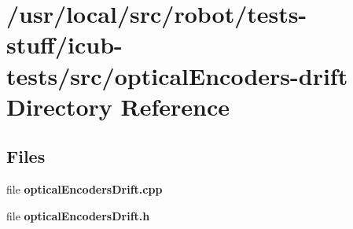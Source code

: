 \section{/usr/local/src/robot/tests-\/stuff/icub-\/tests/src/optical\-Encoders-\/drift Directory Reference}
\label{dir_6292a1d34f76cbbc5d1c993d8b5a10cd}
\subsection*{Files}
\begin{DoxyCompactItemize}
\item 
file {\bfseries optical\-Encoders\-Drift.\-cpp}
\item 
file {\bfseries optical\-Encoders\-Drift.\-h}
\end{DoxyCompactItemize}
